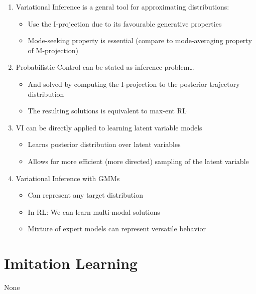 \documentclass[11pt]{scrartcl}
\begin{document}
\begin{enumerate}
    \item Variational Inference is a genral tool for approximating distributions:
    \begin{itemize}
        \item Use the I-projection due to its favourable generative properties
        \item Mode-seeking property is essential (compare to mode-averaging property of M-projection)
    \end{itemize}
    \item Probabilistic Control can be stated as inference problem\dots
    \begin{itemize}
        \item And solved by computing the I-projection to the posterior trajectory distribution
        \item The resulting solutions is equivalent to max-ent RL
    \end{itemize}
    \item VI can be directly applied to learning latent variable models
    \begin{itemize}
        \item Learns posterior distribution over latent variables
        \item Allows for more efficient (more directed) sampling of the latent variable
    \end{itemize}
    \item Variational Inference with GMMs
    \begin{itemize}
        \item Can represent any target distribution
        \item In RL: We can learn multi-modal solutions
        \item Mixture of expert models can represent versatile behavior
    \end{itemize}
\end{enumerate}


\section{Imitation Learning} 

None
\end{document}
